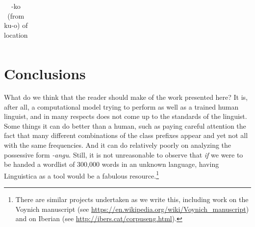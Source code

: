 \documentclass[output=paper,colorlinks,citecolor=brown,
]{langscibook}
\begin{document}
\begin{table}
\begin{center}
\begin{tabular}{lllllllllllllllllll}
 
 
\\
 \end{tabular}
\caption{-ko (from ku-o) of location}
\label{ko}
\end{center}
\end{table}




\section{Conclusions}

What do we think that the reader should make of the work presented here? It is, after all, a computational model trying to perform as well as a trained human linguist, and in many respects does not come up to the standards of the linguist. Some things it can do better than a human, such as paying careful attention the fact that many different combinations of the class prefixes appear and yet not all with the same frequencies. And it can do relatively poorly on analyzing the possessive form \textit{-angu}. Still, it is not unreasonable to observe that \textit{if} we were to be handed a wordlist of 300,000 words in an unknown language, having Linguistica as a tool would be a fabulous resource.\footnote{There are similar projects undertaken as we write this, including work on the Voynich manuscript (see \url{https://en.wikipedia.org/wiki/Voynich\_manuscript}) and on Iberian (see \url{http://ibers.cat/corpuseng.html}).} 
\end{document}
